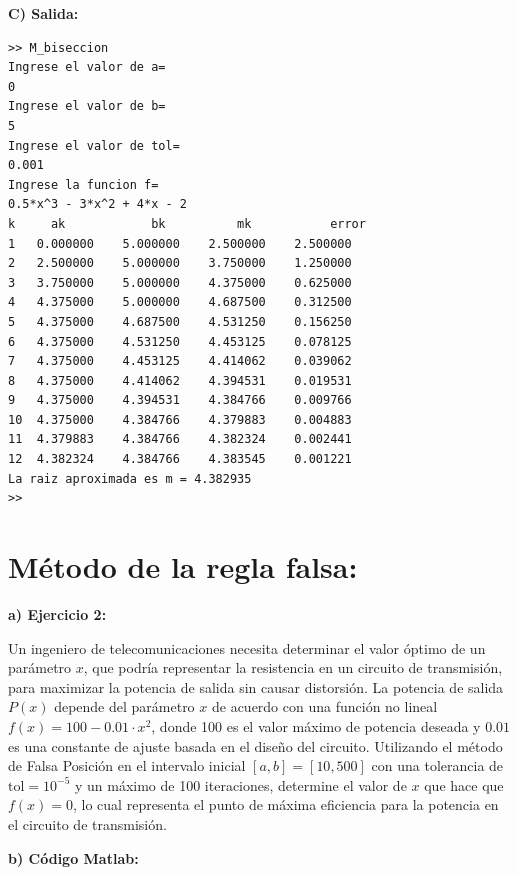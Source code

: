 \documentclass[12pt,a4paper,twoside]{article}  %
\begin{document}
\textbf{C) Salida:}

\begin{verbatim}
>> M_biseccion
Ingrese el valor de a= 
0
Ingrese el valor de b= 
5
Ingrese el valor de tol= 
0.001
Ingrese la funcion f=
0.5*x^3 - 3*x^2 + 4*x - 2
k	  ak		    bk	    	mk		     error
1	0.000000	5.000000	2.500000	2.500000
2	2.500000	5.000000	3.750000	1.250000
3	3.750000	5.000000	4.375000	0.625000
4	4.375000	5.000000	4.687500	0.312500
5	4.375000	4.687500	4.531250	0.156250
6	4.375000	4.531250	4.453125	0.078125
7	4.375000	4.453125	4.414062	0.039062
8	4.375000	4.414062	4.394531	0.019531
9	4.375000	4.394531	4.384766	0.009766
10	4.375000	4.384766	4.379883	0.004883
11	4.379883	4.384766	4.382324	0.002441
12	4.382324	4.384766	4.383545	0.001221
La raiz aproximada es m = 4.382935
>> 
\end{verbatim}



\section{Método de la regla falsa:}

\textbf{a) Ejercicio 2: }

Un ingeniero de telecomunicaciones necesita determinar el valor óptimo de un parámetro \( x \), que podría representar la resistencia en un circuito de transmisión, para maximizar la potencia de salida sin causar distorsión. La potencia de salida \( P(x) \) depende del parámetro \( x \) de acuerdo con una función no lineal \( f(x) = 100 - 0.01 \cdot x^2 \), donde 100 es el valor máximo de potencia deseada y \( 0.01 \) es una constante de ajuste basada en el diseño del circuito. Utilizando el método de Falsa Posición en el intervalo inicial \([a, b] = [10, 500]\) con una tolerancia de \( \text{tol} = 10^{-5} \) y un máximo de 100 iteraciones, determine el valor de \( x \) que hace que \( f(x) = 0 \), lo cual representa el punto de máxima eficiencia para la potencia en el circuito de transmisión.


\textbf{b) Código Matlab:}
\end{document}
